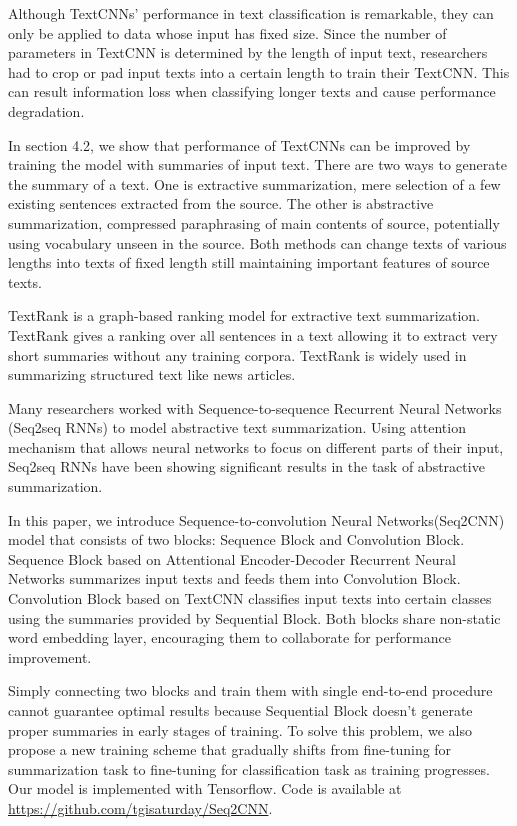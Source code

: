 \documentclass{article}
\begin{document}
Although TextCNNs’ performance in text classification is remarkable, they can only be applied to data whose input has fixed size. Since the number of parameters in TextCNN is determined by the length of input text, researchers had to crop or pad input texts into a certain length to train their TextCNN. This can result information loss when classifying longer texts and cause performance degradation.

In section 4.2, we show that performance of TextCNNs can be improved by training the model with summaries of input text. There are two ways to generate the summary of a text. One is extractive summarization, mere selection of a few existing sentences extracted from the source. The other is abstractive summarization, compressed paraphrasing of main contents of source, potentially using vocabulary unseen in the source. Both methods can change texts of various lengths into texts of fixed length still maintaining important features of source texts. 

TextRank\cite{mihalcea-tarau:2004:EMNLP} is a graph-based ranking model for extractive text summarization. TextRank gives a ranking over all sentences in a text allowing it to extract very short summaries without any training corpora. TextRank is widely used in summarizing structured text like news articles. 

Many researchers worked with Sequence-to-sequence Recurrent Neural Networks (Seq2seq RNNs)\cite{NIPS2014_5346,DBLP:journals/corr/NallapatiXZ16} to model abstractive text summarization. Using attention mechanism\cite{NIPS2015_5847} that allows neural networks to focus on different parts of their input, Seq2seq RNNs have been showing significant results in the task of abstractive summarization\cite{DBLP:journals/corr/RushCW15,DBLP:journals/corr/NallapatiXZ16}.

In this paper, we introduce Sequence-to-convolution Neural Networks(Seq2CNN) model that consists of two blocks: Sequence Block and Convolution Block. Sequence Block based on Attentional Encoder-Decoder Recurrent Neural Networks\cite{DBLP:journals/corr/NallapatiXZ16} summarizes input texts and feeds them into Convolution Block. Convolution Block based on TextCNN\cite{DBLP:journals/corr/Kim14f} classifies input texts into certain classes using the summaries provided by Sequential Block. Both blocks share non-static word embedding layer, encouraging them to collaborate for performance improvement. 

Simply connecting two blocks and train them with single end-to-end procedure cannot guarantee optimal results because Sequential Block doesn’t generate proper summaries in early stages of training. To solve this problem, we also propose a new training scheme that gradually shifts from fine-tuning for summarization task to fine-tuning for classification task as training progresses. Our model is implemented with Tensorflow\cite{tensorflow2015-whitepaper}. Code is available at \href{https://github.com/tgisaturday/Seq2CNN}{https://github.com/tgisaturday/Seq2CNN}. 
\end{document}
